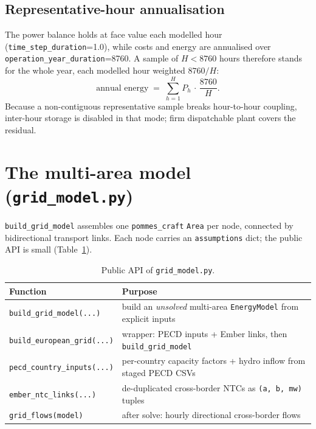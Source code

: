 \documentclass[11pt,a4paper]{article}
\begin{document}
\subsection{Representative-hour annualisation}
The power balance holds at face value each modelled hour (\texttt{time\_step\_duration}=1.0), while
costs and energy are annualised over \texttt{operation\_year\_duration}=8760. A sample of $H<8760$ hours
therefore stands for the whole year, each modelled hour weighted $8760/H$:
\begin{equation}
\text{annual energy} \;=\; \sum_{h=1}^{H} P_h \,\cdot\, \frac{8760}{H}.
\label{eq:annual}
\end{equation}
Because a non-contiguous representative sample breaks hour-to-hour coupling, inter-hour storage is
disabled in that mode; firm dispatchable plant covers the residual.

\section{The multi-area model (\texttt{grid\_model.py})}
\texttt{build\_grid\_model} assembles one \texttt{pommes\_craft} \texttt{Area} per node, connected by
bidirectional transport links. Each node carries an \texttt{assumptions} dict; the public API is small
(Table~\ref{tab:api}).

\begin{table}[ht]
\centering
\caption{Public API of \texttt{grid\_model.py}.}
\label{tab:api}
\small
\begin{tabular}{@{}ll@{}}
\toprule
\textbf{Function} & \textbf{Purpose} \\
\midrule
\texttt{build\_grid\_model(...)}    & build an \emph{unsolved} multi-area \texttt{EnergyModel} from explicit inputs \\
\texttt{build\_european\_grid(...)} & wrapper: PECD inputs + Ember links, then \texttt{build\_grid\_model} \\
\texttt{pecd\_country\_inputs(...)} & per-country capacity factors + hydro inflow from staged PECD CSVs \\
\texttt{ember\_ntc\_links(...)}     & de-duplicated cross-border NTCs as \texttt{(a, b, mw)} tuples \\
\texttt{grid\_flows(model)}         & after solve: hourly directional cross-border flows \\
\bottomrule
\end{tabular}
\end{table}
\end{document}
